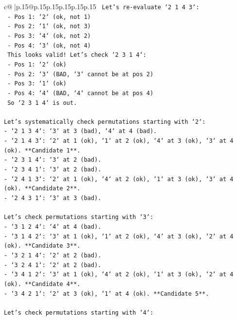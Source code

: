 \documentclass{article}
\begin{document}
{\begin{supertabular}{c@{$\;$}|p{.15\linewidth}@{}p{.15\linewidth}p{.15\linewidth}p{.15\linewidth}p{.15\linewidth}p{.15\linewidth}}
{{{\texttt{  Let's re{-}evaluate `2 1 4 3`:} \\
\texttt{  {-} Pos 1: `2` (ok, not 1)} \\
\texttt{  {-} Pos 2: `1` (ok, not 3)} \\
\texttt{  {-} Pos 3: `4` (ok, not 2)} \\
\texttt{  {-} Pos 4: `3` (ok, not 4)} \\
\texttt{  This looks valid! Let's check `2 3 1 4`:} \\
\texttt{  {-} Pos 1: `2` (ok)} \\
\texttt{  {-} Pos 2: `3` (BAD, `3` cannot be at pos 2)} \\
\texttt{  {-} Pos 3: `1` (ok)} \\
\texttt{  {-} Pos 4: `4` (BAD, `4` cannot be at pos 4)} \\
\texttt{  So `2 3 1 4` is out.} \\
\\ 
\texttt{Let's systematically check permutations starting with `2`:} \\
\texttt{{-} `2 1 3 4`: `3` at 3 (bad), `4` at 4 (bad).} \\
\texttt{{-} `2 1 4 3`: `2` at 1 (ok), `1` at 2 (ok), `4` at 3 (ok), `3` at 4 (ok). **Candidate 1**.} \\
\texttt{{-} `2 3 1 4`: `3` at 2 (bad).} \\
\texttt{{-} `2 3 4 1`: `3` at 2 (bad).} \\
\texttt{{-} `2 4 1 3`: `2` at 1 (ok), `4` at 2 (ok), `1` at 3 (ok), `3` at 4 (ok). **Candidate 2**.} \\
\texttt{{-} `2 4 3 1`: `3` at 3 (bad).} \\
\\ 
\texttt{Let's check permutations starting with `3`:} \\
\texttt{{-} `3 1 2 4`: `4` at 4 (bad).} \\
\texttt{{-} `3 1 4 2`: `3` at 1 (ok), `1` at 2 (ok), `4` at 3 (ok), `2` at 4 (ok). **Candidate 3**.} \\
\texttt{{-} `3 2 1 4`: `2` at 2 (bad).} \\
\texttt{{-} `3 2 4 1`: `2` at 2 (bad).} \\
\texttt{{-} `3 4 1 2`: `3` at 1 (ok), `4` at 2 (ok), `1` at 3 (ok), `2` at 4 (ok). **Candidate 4**.} \\
\texttt{{-} `3 4 2 1`: `2` at 3 (ok), `1` at 4 (ok). **Candidate 5**.} \\
\\ 
\texttt{Let's check permutations starting with `4`:} \\
}}}
\end{supertabular}}
\end{document}
